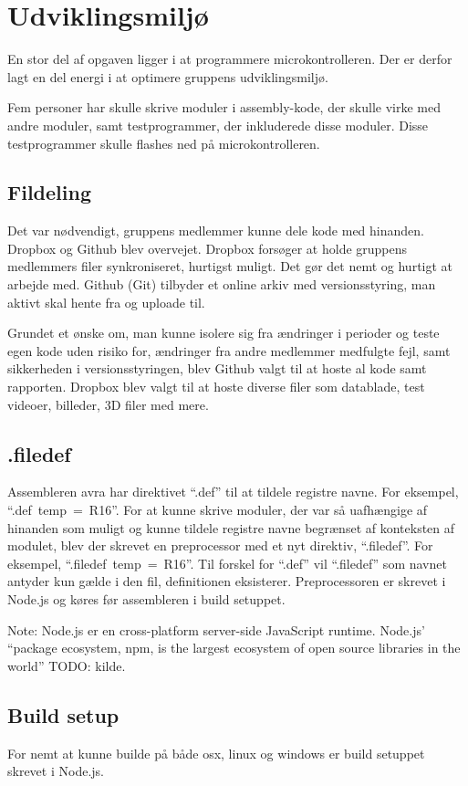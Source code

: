 \section{Udviklingsmiljø}

En stor del af opgaven ligger i at programmere microkontrolleren. Der er derfor lagt en del energi i at optimere gruppens udviklingsmiljø.

Fem personer har skulle skrive moduler i assembly-kode, der skulle virke med andre moduler, samt testprogrammer, der inkluderede disse moduler. Disse testprogrammer skulle flashes ned på microkontrolleren.

\subsection{Fildeling}
Det var nødvendigt, gruppens medlemmer kunne dele kode med hinanden. Dropbox og Github blev overvejet.
Dropbox forsøger at holde gruppens medlemmers filer synkroniseret, hurtigst muligt.
Det gør det nemt og hurtigt at arbejde med.
Github (Git) tilbyder et online arkiv med versionsstyring, man aktivt skal hente fra og uploade til.

Grundet et ønske om, man kunne isolere sig fra ændringer i perioder og teste egen kode uden risiko for, ændringer fra andre medlemmer medfulgte fejl, samt sikkerheden i versionsstyringen, blev Github valgt til at hoste al kode samt rapporten.
Dropbox blev valgt til at hoste diverse filer som datablade, test videoer, billeder, 3D filer med mere.

\subsection{.filedef}
Assembleren avra har direktivet \mbox{``.def''} til at tildele registre navne. For eksempel, \mbox{``.def temp = R16''}.
For at kunne skrive moduler, der var så uafhængige af hinanden som muligt og kunne tildele registre navne begrænset af konteksten af modulet, blev der skrevet en preprocessor med et nyt direktiv, \mbox{``.filedef''}. For eksempel, \mbox{``.filedef temp = R16''}. Til forskel for \mbox{``.def''} vil \mbox{``.filedef''} som navnet antyder kun gælde i den fil, definitionen eksisterer. Preprocessoren er skrevet i Node.js og køres før assembleren i build setuppet.

\begin{mdquote}
	Note: Node.js er en cross-platform server-side JavaScript runtime. Node.js' ``package ecosystem, npm, is the largest ecosystem of open source libraries in the world'' TODO: kilde.
\end{mdquote}

\subsection{Build setup}
For nemt at kunne builde på både osx, linux og windows er build setuppet skrevet i Node.js.
